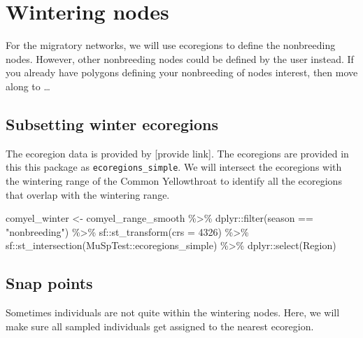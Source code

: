 \documentclass[
]{book}
\newenvironment{Shaded}{\begin{snugshade}}{\end{snugshade}}
\newcommand{\AttributeTok}[1]{\textcolor[rgb]{0.77,0.63,0.00}{#1}}
\newcommand{\DecValTok}[1]{\textcolor[rgb]{0.00,0.00,0.81}{#1}}
\newcommand{\FunctionTok}[1]{\textcolor[rgb]{0.00,0.00,0.00}{#1}}
\newcommand{\NormalTok}[1]{#1}
\newcommand{\OtherTok}[1]{\textcolor[rgb]{0.56,0.35,0.01}{#1}}
\newcommand{\SpecialCharTok}[1]{\textcolor[rgb]{0.00,0.00,0.00}{#1}}
\newcommand{\StringTok}[1]{\textcolor[rgb]{0.31,0.60,0.02}{#1}}
\begin{document}
\hypertarget{wintering}{%
\chapter{Wintering nodes}\label{wintering}}

For the migratory networks, we will use ecoregions to define the nonbreeding nodes. However, other nonbreeding nodes could be defined by the user instead. If you already have polygons defining your nonbreeding of nodes interest, then move along to \ldots{}

\hypertarget{subsetting-winter-ecoregions}{%
\section{Subsetting winter ecoregions}\label{subsetting-winter-ecoregions}}

The ecoregion data is provided by {[}provide link{]}. The ecoregions are provided in this this package as \texttt{ecoregions\_simple}. We will intersect the ecoregions with the wintering range of the Common Yellowthroat to identify all the ecoregions that overlap with the wintering range.

\begin{Shaded}
\begin{Highlighting}[]
\NormalTok{comyel\_winter }\OtherTok{\textless{}{-}}\NormalTok{ comyel\_range\_smooth }\SpecialCharTok{\%\textgreater{}\%}
\NormalTok{  dplyr}\SpecialCharTok{::}\FunctionTok{filter}\NormalTok{(season }\SpecialCharTok{==} \StringTok{"nonbreeding"}\NormalTok{) }\SpecialCharTok{\%\textgreater{}\%}
\NormalTok{  sf}\SpecialCharTok{::}\FunctionTok{st\_transform}\NormalTok{(}\AttributeTok{crs =} \DecValTok{4326}\NormalTok{) }\SpecialCharTok{\%\textgreater{}\%}
\NormalTok{  sf}\SpecialCharTok{::}\FunctionTok{st\_intersection}\NormalTok{(MuSpTest}\SpecialCharTok{::}\NormalTok{ecoregions\_simple) }\SpecialCharTok{\%\textgreater{}\%}
\NormalTok{  dplyr}\SpecialCharTok{::}\FunctionTok{select}\NormalTok{(Region)}
\end{Highlighting}
\end{Shaded}

\hypertarget{snap-points}{%
\section{Snap points}\label{snap-points}}

Sometimes individuals are not quite within the wintering nodes. Here, we will make sure all sampled individuals get assigned to the nearest ecoregion.
\end{document}

